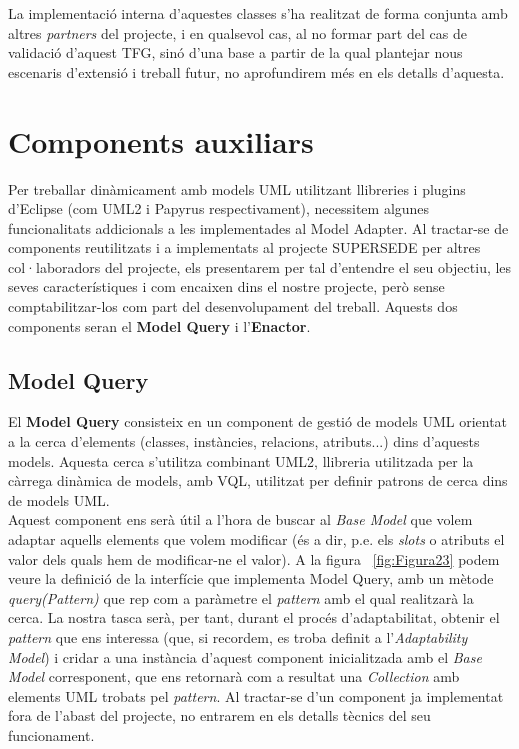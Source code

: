La implementació interna d'aquestes classes s'ha realitzat de forma conjunta amb altres \textit{partners} del projecte, i en qualsevol cas, al no formar part del cas de validació d'aquest TFG, sinó d'una base a partir de la qual plantejar nous escenaris d'extensió i treball futur, no aprofundirem més en els detalls d'aquesta.\\

\section{Components auxiliars}

Per treballar dinàmicament amb models UML utilitzant llibreries i plugins d'Eclipse (com UML2 i Papyrus respectivament), necessitem algunes funcionalitats addicionals a les implementades al Model Adapter. Al tractar-se de components reutilitzats i a implementats al projecte SUPERSEDE per altres col·laboradors del projecte, els presentarem per tal d'entendre el seu objectiu, les seves característiques i com encaixen dins el nostre projecte, però sense comptabilitzar-los com part del desenvolupament del treball. Aquests dos components seran el \textbf{Model Query} i l'\textbf{Enactor}.

\subsection{Model Query}

El \textbf{Model Query} consisteix en un component de gestió de models UML orientat a la cerca d'elements (classes, instàncies, relacions, atributs...) dins d'aquests models. Aquesta cerca s'utilitza combinant UML2, llibreria utilitzada per la càrrega dinàmica de models, amb VQL, utilitzat per definir patrons de cerca dins de models UML.\\

Aquest component ens serà útil a l'hora de buscar al \textit{Base Model} que volem adaptar aquells elements que volem modificar (és a dir, p.e. els \textit{slots} o atributs el valor dels quals hem de modificar-ne el valor). A la figura ~\ref{fig:Figura23} podem veure la definició de la interfície que implementa Model Query, amb un mètode \textit{query(Pattern)} que rep com a paràmetre el \textit{pattern} amb el qual realitzarà la cerca. La nostra tasca serà, per tant, durant el procés d'adaptabilitat, obtenir el \textit{pattern} que ens interessa (que, si recordem, es troba definit a l'\textit{Adaptability Model}) i cridar a una instància d'aquest component inicialitzada amb el \textit{Base Model} corresponent, que ens retornarà com a resultat una \textit{Collection} amb elements UML trobats pel \textit{pattern}. Al tractar-se d'un component ja implementat fora de l'abast del projecte, no entrarem en els detalls tècnics del seu funcionament.

